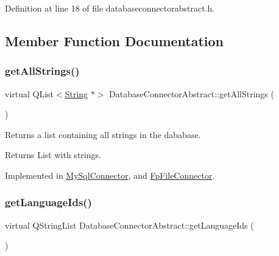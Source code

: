 Definition at line 18 of file databaseconnectorabstract.\+h.



\subsection{Member Function Documentation}
\mbox{\label{classDatabaseConnectorAbstract_aeb4347bc18b6bed9a9b6120f68c10e9d}} 
\subsubsection{\texorpdfstring{get\+All\+Strings()}{getAllStrings()}}
{\footnotesize\ttfamily virtual Q\+List$<$\mbox{\hyperlink{classString}{String}} $\ast$$>$ Database\+Connector\+Abstract\+::get\+All\+Strings (\begin{DoxyParamCaption}{ }\end{DoxyParamCaption})\hspace{0.3cm}{\ttfamily [pure virtual]}}



Returns a list containing all strings in the dababase. 

\begin{DoxyReturn}{Returns}
List with strings. 
\end{DoxyReturn}


Implemented in \mbox{\hyperlink{classMySqlConnector_ad6ff79c4049e3631800da97e8d7b7704}{My\+Sql\+Connector}}, and \mbox{\hyperlink{classFpFileConnector_ad392db922a5e04a670b84fc616192eea}{Fp\+File\+Connector}}.

\mbox{\label{classDatabaseConnectorAbstract_a98f5b2472bab6edc82ce2c5554319d7f}} 
\subsubsection{\texorpdfstring{get\+Language\+Ids()}{getLanguageIds()}}
{\footnotesize\ttfamily virtual Q\+String\+List Database\+Connector\+Abstract\+::get\+Language\+Ids (\begin{DoxyParamCaption}{ }\end{DoxyParamCaption})\hspace{0.3cm}{\ttfamily [pure virtual]}}



